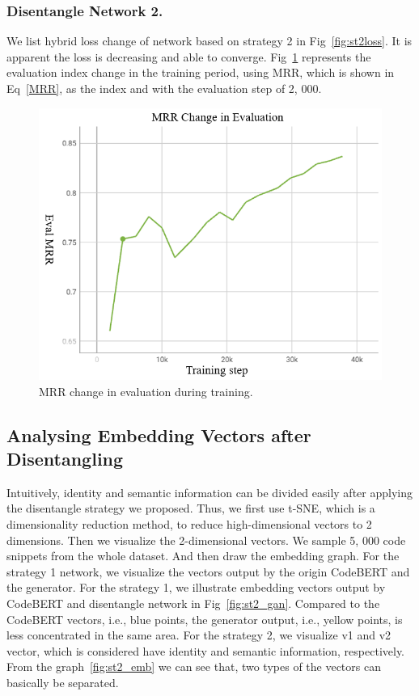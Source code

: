 \subsubsection{Disentangle Network 2.}
We list hybrid loss change of network based on strategy 2 in Fig~\ref{fig:st2loss}. 
It is apparent the loss is decreasing and able to converge. 
Fig~\ref{fig:st2eval} represents the evaluation index change in the training period, 
using MRR, which is shown in Eq~\ref{MRR}, as the index and with the evaluation step of 2, 000. 

\begin{figure}[htb]
	\centering
	\includegraphics[width=0.9\linewidth]{imgs/st2_eval.png}
	\caption{MRR change in evaluation during training.}
	\label{fig:st2eval}
\end{figure}

\subsection{Analysing Embedding Vectors after Disentangling}
Intuitively, identity and semantic information can be divided easily after 
applying the disentangle strategy we proposed. Thus, we first use t-SNE, 
which is a dimensionality reduction method, to 
reduce high-dimensional vectors to 2 dimensions. 
Then we visualize the 2-dimensional vectors. 
We sample 5, 000 code snippets from the whole dataset. 
And then draw the embedding graph. For the strategy 1 network, 
we visualize the vectors output by the origin CodeBERT and the generator. 
For the strategy 1, we illustrate embedding vectors output 
by CodeBERT and disentangle network in Fig~\ref{fig:st2_gan}. Compared to the CodeBERT vectors, i.e., 
blue points, the generator output, i.e., yellow points, 
is less concentrated in the same area. For the strategy 2, 
we visualize v1 and v2 vector, which is considered have identity and semantic information, 
respectively. From the graph~\ref{fig:st2_emb} we can see that, 
two types of the vectors can basically be separated. 

